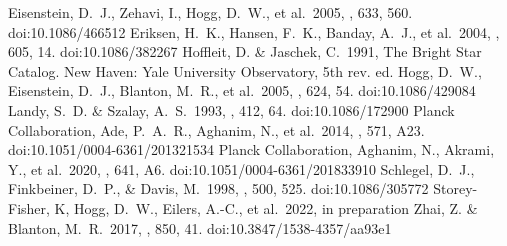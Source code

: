 \documentclass[modern]{aastex631}
\begin{document}


\begin{thebibliography}{dummy}
 Eisenstein, D.~J., Zehavi, I., Hogg, D.~W., et al.\ 2005, \apj, 633, 560. doi:10.1086/466512
 Eriksen, H.~K., Hansen, F.~K., Banday, A.~J., et al.\ 2004, \apj, 605, 14. doi:10.1086/382267
Hoffleit, D. \& Jaschek, C.\ 1991, The Bright Star Catalog. New Haven: Yale University Observatory, 5th rev. ed.
 Hogg, D.~W., Eisenstein, D.~J., Blanton, M.~R., et al.\ 2005, \apj, 624, 54. doi:10.1086/429084
 Landy, S.~D. \& Szalay, A.~S.\ 1993, \apj, 412, 64. doi:10.1086/172900
 Planck Collaboration, Ade, P.~A.~R., Aghanim, N., et al.\ 2014, \aap, 571, A23. doi:10.1051/0004-6361/201321534
 Planck Collaboration, Aghanim, N., Akrami, Y., et al.\ 2020, \aap, 641, A6. doi:10.1051/0004-6361/201833910
 Schlegel, D.~J., Finkbeiner, D.~P., \& Davis, M.\ 1998, \apj, 500, 525. doi:10.1086/305772
 Storey-Fisher, K, Hogg, D.~W., Eilers, A.-C., et al.\ 2022, in preparation
 Zhai, Z. \& Blanton, M.~R.\ 2017, \apj, 850, 41. doi:10.3847/1538-4357/aa93e1
\end{thebibliography}
\end{document}

